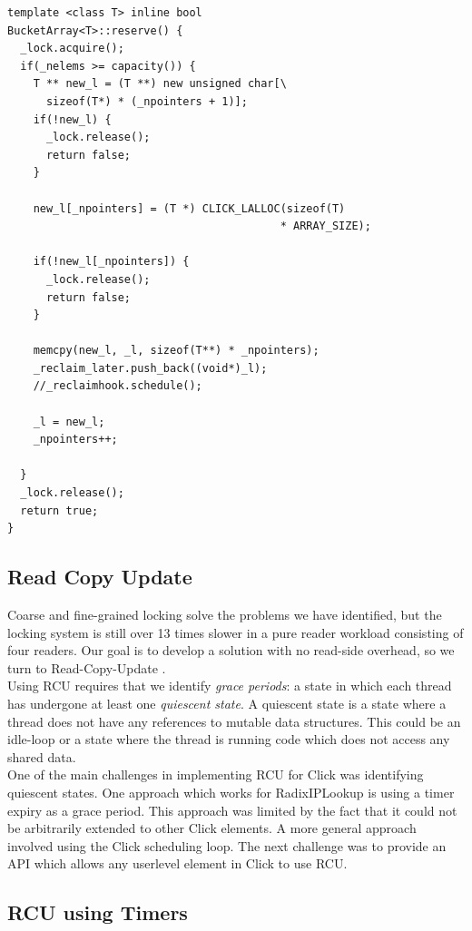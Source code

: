 \documentclass[a4paper,marginparwidth=50pt,marginparsep=10pt]{article}
\begin{document}
\begin{lstlisting}[caption=Locking in reserve(), label=bucketvectorreservelisting]
template <class T> inline bool
BucketArray<T>::reserve() {
  _lock.acquire();
  if(_nelems >= capacity()) {
    T ** new_l = (T **) new unsigned char[\
      sizeof(T*) * (_npointers + 1)];
    if(!new_l) {
      _lock.release();
      return false;
    }
    
    new_l[_npointers] = (T *) CLICK_LALLOC(sizeof(T) 
                                          * ARRAY_SIZE);
    
    if(!new_l[_npointers]) {
      _lock.release();
      return false;
    }
    
    memcpy(new_l, _l, sizeof(T**) * _npointers);
    _reclaim_later.push_back((void*)_l);
    //_reclaimhook.schedule();

    _l = new_l;
    _npointers++;
    
  }
  _lock.release();
  return true;
}
\end{lstlisting}
\subsection{Read Copy Update}
\label{sec:rcu}
Coarse and fine-grained locking solve the problems we have identified, but the locking system is still over 13 times slower in a pure reader workload consisting of four readers. Our goal is to develop a solution with no read-side overhead, so we turn to Read-Copy-Update \cite{readcopyupdate}.\\

Using RCU requires that we identify \emph{grace periods}: a state in which each thread has undergone at least one \emph{quiescent state}. A quiescent state is a state where a thread does not have any references to mutable data structures. This could be an idle-loop or a state where the thread is running code which does not access any shared data.\\

One of the main challenges in implementing RCU for Click was identifying quiescent states. One approach which works for RadixIPLookup  is using a timer expiry as a grace period. This approach was limited by the fact that it could not be arbitrarily extended to other Click elements. A more general approach involved using the Click scheduling loop. The next challenge was to provide an API which allows any userlevel element in Click to use RCU. 
\subsection{RCU using Timers}\label{sec:rcutimers}
\end{document}
